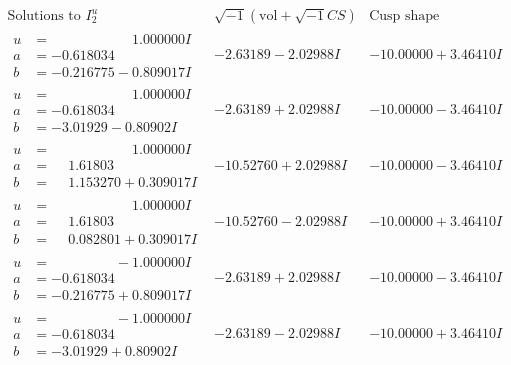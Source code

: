 \documentclass[1p]{elsarticle_modified}
\theoremstyle{definition}
\newcommand{\I}{\sqrt{-1}}
\begin{document}
$$\begin{array}{c|c|c}  
\text{Solutions to }I^u_{2}& \I (\text{vol} + \sqrt{-1}CS) & \text{Cusp shape}\\
 \hline 
\begin{aligned}
u &= \phantom{-0.000000 -}1.000000 I \\
a &= -0.618034\phantom{ +0.000000I} \\
b &= -0.216775 - 0.809017 I\end{aligned}
 & -2.63189 - 2.02988 I & -10.00000 + 3.46410 I \\ \hline\begin{aligned}
u &= \phantom{-0.000000 -}1.000000 I \\
a &= -0.618034\phantom{ +0.000000I} \\
b &= -3.01929 - 0.80902 I\end{aligned}
 & -2.63189 + 2.02988 I & -10.00000 - 3.46410 I \\ \hline\begin{aligned}
u &= \phantom{-0.000000 -}1.000000 I \\
a &= \phantom{-}1.61803\phantom{ +0.000000I} \\
b &= \phantom{-}1.153270 + 0.309017 I\end{aligned}
 & -10.52760 + 2.02988 I & -10.00000 - 3.46410 I \\ \hline\begin{aligned}
u &= \phantom{-0.000000 -}1.000000 I \\
a &= \phantom{-}1.61803\phantom{ +0.000000I} \\
b &= \phantom{-}0.082801 + 0.309017 I\end{aligned}
 & -10.52760 - 2.02988 I & -10.00000 + 3.46410 I \\ \hline\begin{aligned}
u &= \phantom{-0.000000 } -1.000000 I \\
a &= -0.618034\phantom{ +0.000000I} \\
b &= -0.216775 + 0.809017 I\end{aligned}
 & -2.63189 + 2.02988 I & -10.00000 - 3.46410 I \\ \hline\begin{aligned}
u &= \phantom{-0.000000 } -1.000000 I \\
a &= -0.618034\phantom{ +0.000000I} \\
b &= -3.01929 + 0.80902 I\end{aligned}
 & -2.63189 - 2.02988 I & -10.00000 + 3.46410 I \\ \hline\begin{aligned}

\end{aligned}
\end{array}$$
\end{document}
